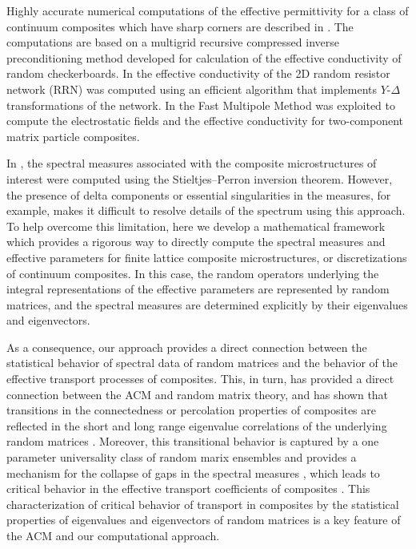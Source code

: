 \documentclass{cmslatex}
\begin{document}
Highly accurate numerical computations of the effective permittivity
for a class of continuum composites which have sharp corners are
described in \cite{Helsing:NJP:115005}. The computations are based on
a multigrid recursive compressed inverse preconditioning method
\cite{Helsing:2008:8820,Helsing:JCP:1171,Helsing:JCP:7533} developed 
for calculation of the effective conductivity of random
checkerboards. In \cite{Day:JPCM-96} the effective 
conductivity of the 2D random resistor network (RRN) 
was computed using an efficient algorithm that implements $Y$-$\Delta$
transformations of the network. In
\cite{Greengard:1994:379,Cheng:1997:629,Greengard:2006:64} the Fast
Multipole Method was exploited to compute the electrostatic fields and
the effective conductivity for two-component matrix particle
composites.      


In \cite{Helsing:NJP:115005,Day:JPCM-96}, the spectral measures
associated with the composite microstructures of interest were
computed using the Stieltjes--Perron inversion theorem. However, the
presence of delta components or essential singularities in the
measures, for example, makes it difficult to resolve details of the
spectrum using this approach. To help overcome this limitation, here
we develop a mathematical framework which provides a rigorous way to
directly compute the spectral measures and effective parameters for
finite lattice composite microstructures, or discretizations of
continuum composites. In this case, the random operators underlying the
integral representations of the effective parameters are represented
by random matrices, and the spectral measures are determined
explicitly by their eigenvalues and eigenvectors.



As a consequence,
our approach provides a direct connection between the statistical
behavior of spectral data of random matrices and the behavior of the
effective transport processes of composites. This, in turn, has
provided a direct connection between the ACM and random matrix theory,
and has shown that transitions in the connectedness or percolation
properties of composites are reflected in the short and long range
eigenvalue correlations of the underlying random matrices
\cite{Murphy_RMT_of_Composites}. Moreover, this transitional behavior
is captured by a one parameter universality class of random marix
ensembles and provides a mechanism for the collapse of gaps in the
spectral measures \cite{Murphy_RMT_of_Composites}, which leads to
critical behavior in the effective transport coefficients of
composites \cite{Murphy:JMP:063506}. This characterization of critical
behavior of transport in composites by the statistical properties of
eigenvalues and eigenvectors of random matrices is a key feature of
the ACM and our computational approach. 
\end{document}

